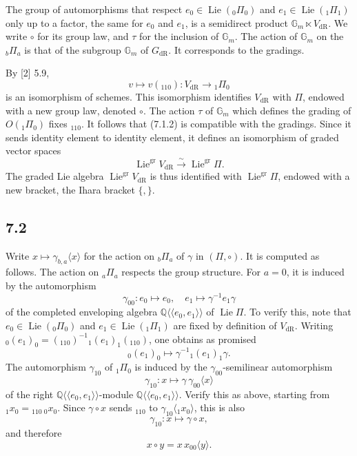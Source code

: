 \documentclass[11pt]{article}
\newcommand{\Q}{\mathbb Q}
\newcommand{\Gm}{\mathbb G_m}
\newcommand{\Lie}{\operatorname{Lie}}
\newcommand{\dR}{\mathrm{dR}}
\begin{document}
The group of automorphisms that respect $e_0\in\Lie({}_0\Pi_0)$ and $e_1\in\Lie({}_1\Pi_1)$ only up to a factor, the same for $e_0$ and $e_1$, is a semidirect product $\Gm\ltimes V_{\dR}$.
We write $\circ$ for its group law, and $\tau$ for the inclusion of $\Gm$.
The action of $\Gm$ on the ${}_b\Pi_a$ is that of the subgroup $\Gm$ of $G_{\dR}$.
It corresponds to the gradings.

By [2] 5.9,
\begin{equation}
 v\longmapsto v({}_110):V_{\dR}\longrightarrow{}_1\Pi_0
\tag{7.1.2}
\end{equation}
is an isomorphism of schemes.
This isomorphism identifies $V_{\dR}$ with $\Pi$, endowed with a new group law, denoted $\circ$.
The action $\tau$ of $\Gm$ which defines the grading of $O({}_1\Pi_0)$ fixes ${}_110$.
It follows that (7.1.2) is compatible with the gradings.
Since it sends identity element to identity element, it defines an isomorphism of graded vector spaces
\begin{equation}
 \Lie^{\mathrm{gr}}V_{\dR}\xrightarrow{\sim}\Lie^{\mathrm{gr}}\Pi.
\tag{7.1.3}
\end{equation}
The graded Lie algebra $\Lie^{\mathrm{gr}}V_{\dR}$ is thus identified with $\Lie^{\mathrm{gr}}\Pi$, endowed with a new bracket, the Ihara bracket $\{,\}$.

\subsection*{7.2}
Write $x\mapsto \gamma_{b,a}\langle x\rangle$ for the action on ${}_b\Pi_a$ of $\gamma$ in $(\Pi,\circ)$.
It is computed as follows.
The action on ${}_a\Pi_a$ respects the group structure.
For $a=0$, it is induced by the automorphism
\begin{equation}
 \gamma_{00}: e_0\longmapsto e_0,\quad e_1\longmapsto \gamma^{-1}e_1\gamma
\tag{7.2.1}
\end{equation}
of the completed enveloping algebra $\Q\langle\!\langle e_0,e_1\rangle\!\rangle$ of $\Lie\Pi$.
To verify this, note that $e_0\in\Lie({}_0\Pi_0)$ and $e_1\in\Lie({}_1\Pi_1)$ are fixed by definition of $V_{\dR}$.
Writing ${}_0(e_1)_0=({}_110)^{-1}{}_1(e_1)_1({}_110)$, one obtains as promised
\[
 {}_0(e_1)_0\longmapsto \gamma^{-1}{}_1(e_1)_1\gamma.
\]
The automorphism $\gamma_{10}$ of ${}_1\Pi_0$ is induced by the $\gamma_{00}$-semilinear automorphism
\begin{equation}
 \gamma_{10}:x\longmapsto \gamma\,\gamma_{00}\langle x\rangle
\tag{7.2.2}
\end{equation}
of the right $\Q\langle\!\langle e_0,e_1\rangle\!\rangle$-module $\Q\langle\!\langle e_0,e_1\rangle\!\rangle$.
Verify this as above, starting from ${}_1x_0={}_110\,{}_0x_0$.
Since $\gamma\circ x$ sends ${}_110$ to $\gamma_{10}\langle{}_1x_0\rangle$, this is also
\begin{equation}
 \gamma_{10}:x\longmapsto\gamma\circ x,
\tag{7.2.3}
\end{equation}
and therefore
\begin{equation}
 x\circ y=x\,x_{00}\langle y\rangle.
\tag{7.2.4}
\end{equation}
\end{document}
